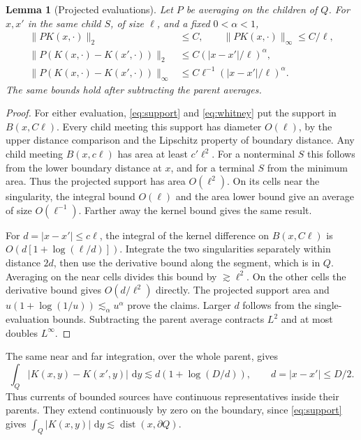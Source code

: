 \documentclass[11pt]{article}
\newtheorem{lemma}[theorem]{Lemma}
\newcommand{\dist}{\operatorname{dist}}
\newcommand{\dd}{\,\mathrm d}
\begin{document}
\begin{lemma}[Projected evaluations]\label{lem:projected}
Let \(P\) be averaging on the children of \(Q\). For \(x,x'\)
in the same child \(S\), of size \(\ell\), and a fixed \(0<\alpha<1\),
\begin{align*}
 \|P K(x,\cdot)\|_2 &\le C,\qquad
 \|P K(x,\cdot)\|_\infty\le C/\ell,\\
 \|P(K(x,\cdot)-K(x',\cdot))\|_2
 &\le C (|x-x'|/\ell)^\alpha,\\
 \|P(K(x,\cdot)-K(x',\cdot))\|_\infty
 &\le C\ell^{-1} (|x-x'|/\ell)^\alpha .
\end{align*}
The same bounds hold after subtracting the parent averages.
\end{lemma}
\begin{proof}
For either evaluation, \eqref{eq:support} and \eqref{eq:whitney}
put the support in \(B(x,C\ell)\). Every child meeting this
support has diameter \(O(\ell)\), by the upper distance comparison
and the Lipschitz property of boundary distance.
Any child meeting \(B(x,c\ell)\) has area at least \(c'\ell^2\).
For a nonterminal \(S\) this follows from the lower boundary
distance at \(x\), and for a terminal \(S\) from the minimum area.
Thus the projected support has area \(O(\ell^2)\). On its
cells near the singularity, the integral bound \(O(\ell)\)
and the area lower bound give an average of size \(O(\ell^{-1})\).
Farther away the kernel bound gives the same result.

For \(d=|x-x'|\le c\ell\), the integral of the kernel difference
on \(B(x,C\ell)\) is \(O(d[1+\log(\ell/d)])\).
Integrate the two singularities separately within distance \(2d\),
then use the derivative bound along the segment, which is in \(Q\).
Averaging on the near cells divides this bound by
\(\gtrsim\ell^2\). On the other cells the derivative bound gives
\(O(d/\ell^2)\) directly. The projected support area and
\(u(1+\log(1/u))\lesssim_\alpha u^\alpha\) prove the claims.
Larger \(d\) follows from the single-evaluation bounds.
Subtracting the parent average contracts \(L^2\) and at most
doubles \(L^\infty\).
\end{proof}

The same near and far integration, over the whole parent, gives
\begin{equation}\label{eq:lone}
 \int_Q |K(x,y)-K(x',y)|\,\dd y
 \lesssim d(1+\log(D/d)),\qquad d=|x-x'|\le D/2.
\end{equation}
Thus currents of bounded sources have continuous representatives
inside their parents. They extend continuously by zero on the
boundary, since \eqref{eq:support} gives
\(\int_Q|K(x,y)|\,\dd y\lesssim\dist(x,\partial Q)\).
\end{document}
